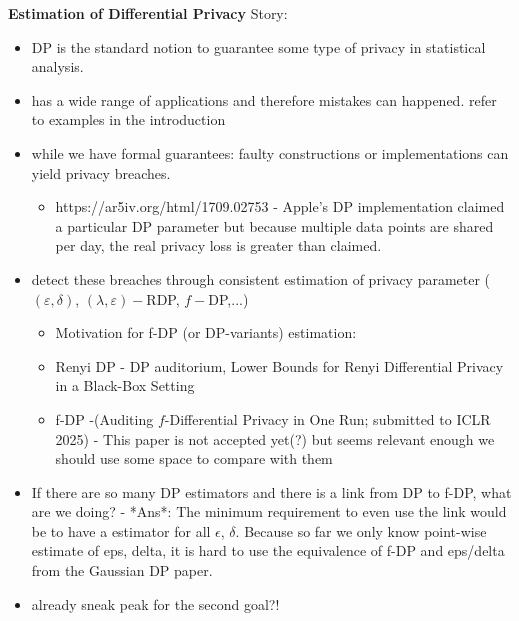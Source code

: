 \textbf{Estimation of Differential Privacy}
Story:
\begin{itemize}
    \item DP is the standard notion to guarantee some type of privacy in statistical analysis.
    \item has a wide range of applications and therefore mistakes can happened. refer to examples in the introduction
    \item while we have formal guarantees: faulty constructions or implementations can yield privacy breaches.
    \begin{itemize}
        \item https://ar5iv.org/html/1709.02753 - Apple's DP implementation claimed a particular DP parameter but because multiple data points are shared per day, the real privacy loss is greater than claimed.
    \end{itemize}
    \item detect these breaches through consistent estimation of privacy parameter ($(\varepsilon,\delta)$, $(\lambda,\varepsilon)-$RDP, $f-$DP,...)
    \begin{itemize}
        \item Motivation for f-DP (or DP-variants) estimation: \item Renyi DP - DP auditorium, Lower Bounds for Renyi Differential Privacy in a Black-Box Setting
        \item f-DP -(Auditing $f$-Differential Privacy in One Run; submitted to ICLR 2025) - This paper is not accepted yet(?) but seems relevant enough we should use some space to compare with them
    \end{itemize}
    \item {\color{red}If there are so many DP estimators and there is a link from DP to f-DP, what are we doing? -  *Ans*: The minimum requirement to even use the link would be to have a estimator for all $\epsilon$, $\delta$. Because so far we only know point-wise estimate of eps, delta, it is hard to use the equivalence of f-DP and eps/delta from the Gaussian DP paper. 
    }
    \item already sneak peak for the second goal?!
\end{itemize}
